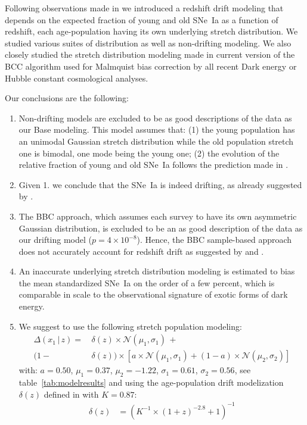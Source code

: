 \documentclass[]{aa} %
\newcommand{\nn}[1]{{\textcolor[rgb]{1, 0.27, 0}{#1}}}
\begin{document}
Following observations made in \cite{rigault2018} we introduced a redshift drift
modeling that depends on the expected fraction of young and old SNe~Ia as a
function of redshift, each age-population having its own underlying stretch
distribution. We studied various suites of distribution as well as non-drifting
modeling. We also closely studied the stretch distribution modeling made in
current version of the BCC algorithm used for Malmquist bias correction by all
recent Dark energy or Hubble constant cosmological analyses. 

Our conclusions are the following:
\begin{enumerate}

    \item Non-drifting models are excluded to be as good descriptions of the
        data \nn{as} our Base modeling. This model assumes that: (1) the young
        population has an unimodal Gaussian stretch distribution while the old
        population stretch one is bimodal, one mode being the young one; (2) the
        evolution of the relative fraction of young and old SNe~Ia follows the
        prediction made in \cite{rigault2018}. 

    \item Given 1. we conclude that the SNe~Ia is indeed drifting, as already
        suggested by \citep[e.g.][]{howell2007}. 

    \item The BBC approach, which assumes each survey to have its own asymmetric
        Gaussian distribution, is excluded to be an as good description of the
        data as our drifting model ($p=4\times10^{-8}$). Hence, the BBC
        sample-based approach does not accurately account for redshift drift as
        suggested by \cite{scolnic2016} and \cite{scolnic2018a}.

    \item An inaccurate underlying stretch distribution modeling is estimated to
        bias the mean standardized SNe~Ia on the order of a few percent, which
        is comparable in scale to the observational signature of exotic forms of
        dark energy.

    \item We suggest to use the following stretch population modeling:
    \begin{align}
    \label{eqconclusion:stretchz}
        \Delta\left(x_1\,|\,z \right) =
        &\,\delta(z)\times\mathcal{N}(\mu_1,\sigma_1)\,+\nonumber\\
        (1-&\,\delta(z)) \times  \left[a\times\mathcal{N}(\mu_1,\sigma_1) +
        (1-a)\times\mathcal{N}(\mu_2,\sigma_2)\right]\nonumber
    \end{align}
    with: $a=0.50$, $\mu_1=0.37$, $\mu_2=-1.22$, $\sigma_1=0.61$,
    $\sigma_2=0.56$, see table~\ref{tab:modelresults} and using the
    age-population drift modelization $\delta(z)$ defined in \cite{rigault2018}
    with $K=0.87$:
    \begin{align}
        \delta(z) & = \left( K^{-1} \times (1+z)^{-2.8} +1 \right)^{-1}\nonumber
    \end{align}
\end{enumerate}
\end{document}
